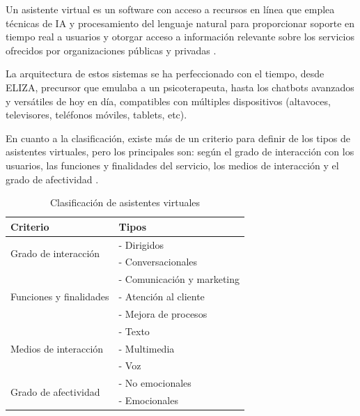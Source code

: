 Un asistente virtual es un software con acceso a recursos en línea que emplea técnicas de IA y procesamiento del lenguaje natural para proporcionar soporte en tiempo real a usuarios y otorgar acceso a información relevante sobre los servicios ofrecidos por organizaciones públicas y privadas \parencite{tfgAlexa1}.

La arquitectura de estos sistemas se ha perfeccionado con el tiempo, desde ELIZA, precursor que emulaba a un psicoterapeuta, hasta los chatbots avanzados y versátiles de hoy en día, compatibles con múltiples dispositivos (altavoces, televisores, teléfonos móviles, tablets, etc).

En cuanto a la clasificación, existe más de un criterio para definir de los tipos de asistentes virtuales, pero los principales son: según el grado de interacción con los usuarios, las funciones y finalidades del servicio, los medios de interacción y el grado de afectividad \parencite{asistentesConv}.

\begin{table}[H]
    \centering
    \begin{tabular}{|l|l|}
    \hline
    \rowcolor{lightgray}
    \textbf{Criterio} & \textbf{Tipos} \\
    \hline
    \multirow{2}{*}{Grado de interacción} & - Dirigidos \\
     & - Conversacionales \\
    \hline
    \multirow{3}{*}{Funciones y finalidades} & - Comunicación y marketing \\
     & - Atención al cliente \\
     & - Mejora de procesos \\
    \hline
    \multirow{3}{*}{Medios de interacción} & - Texto \\
     & - Multimedia \\
     & - Voz \\
    \hline
    \multirow{2}{*}{Grado de afectividad} & - No emocionales \\
     & - Emocionales \\
    \hline
    \end{tabular}
    \caption{Clasificación de asistentes virtuales}
    \label{tab:criterios_asistentes_virtuales}
\end{table}

